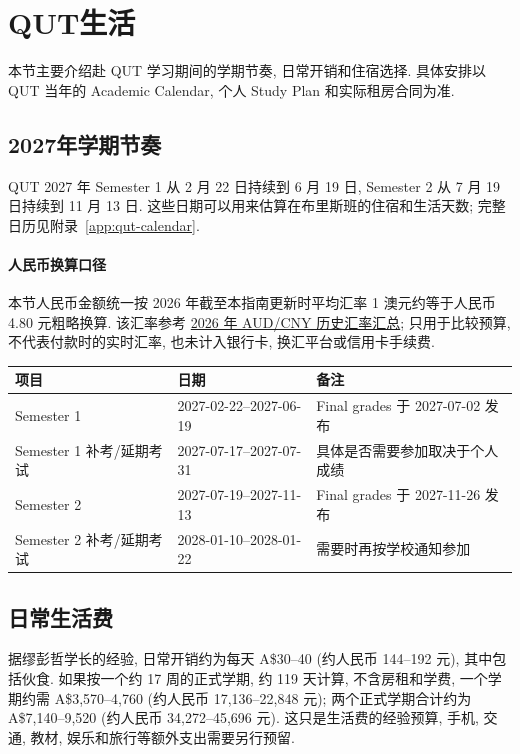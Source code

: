 \documentclass[UTF8,a4paper,12pt]{ctexart}
\newif\ifcourseopen
\newif\ifcourseheaderprinted
\newcounter{courseitem}
\newcommand{\finishcourse}{%
 \ifcourseopen
 \par\end{minipage}\end{tcolorbox}%
 \courseopenfalse
 \fi
}
\newcommand{\coursereset}{\finishcourse\setcounter{courseitem}{0}\courseheaderprintedfalse}
\newcommand{\official}[2]{\href{#1}{#2}}
\let\origsection\section
\renewcommand{\section}{\coursereset\origsection}
\let\origsubsection\subsection
\renewcommand{\subsection}{\coursereset\origsubsection}
\let\orignewpage\newpage
\renewcommand{\newpage}{\finishcourse\orignewpage}
\begin{document}
\normalsize


\newpage
\section{QUT生活}\label{sec:qut-life}

本节主要介绍赴 QUT 学习期间的学期节奏, 日常开销和住宿选择. 具体安排以 QUT 当年的 Academic Calendar, 个人 Study Plan 和实际租房合同为准.

\subsection{2027年学期节奏}

QUT 2027 年 Semester 1 从 2 月 22 日持续到 6 月 19 日, Semester 2 从 7 月 19 日持续到 11 月 13 日. 这些日期可以用来估算在布里斯班的住宿和生活天数; 完整日历见附录~\ref{app:qut-calendar}.

\paragraph{人民币换算口径} 本节人民币金额统一按 2026 年截至本指南更新时平均汇率 1 澳元约等于人民币 4.80 元粗略换算. 该汇率参考 \official{https://www.exchange-rates.org/exchange-rate-history/aud-cny-2026}{2026 年 AUD/CNY 历史汇率汇总}; 只用于比较预算, 不代表付款时的实时汇率, 也未计入银行卡, 换汇平台或信用卡手续费.

\scriptsize
\renewcommand{\arraystretch}{1.15}
\begin{longtable}{p{}p{}p{}}
\toprule
项目 & 日期 & 备注 \\
\midrule
\endhead
\bottomrule
\endfoot
Semester 1 & 2027-02-22--2027-06-19 & Final grades 于 2027-07-02 发布 \\
Semester 1 补考/延期考试 & 2027-07-17--2027-07-31 & 具体是否需要参加取决于个人成绩 \\
Semester 2 & 2027-07-19--2027-11-13 & Final grades 于 2027-11-26 发布 \\
Semester 2 补考/延期考试 & 2028-01-10--2028-01-22 & 需要时再按学校通知参加 \\
\end{longtable}
\normalsize

\subsection{日常生活费}

据缪彭哲学长的经验, 日常开销约为每天 A\$30--40 (约人民币 144--192 元), 其中包括伙食. 如果按一个约 17 周的正式学期, 约 119 天计算, 不含房租和学费, 一个学期约需 A\$3,570--4,760 (约人民币 17,136--22,848 元); 两个正式学期合计约为 A\$7,140--9,520 (约人民币 34,272--45,696 元). 这只是生活费的经验预算, 手机, 交通, 教材, 娱乐和旅行等额外支出需要另行预留.
\end{document}
